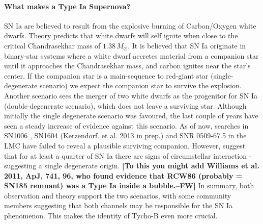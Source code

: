 \documentclass[12pt]{article}
\begin{document}
\vspace{-5mm}
\paragraph{What makes a Type Ia Supernova?}
SN Ia are believed to result from the explosive burning of Carbon/Oxygen white dwarfs. Theory predicts that white dwarfs will self ignite when close to the critical Chandrasekhar mass of  $1.38\,M_\odot$. 
It is believed that SN Ia originate in binary-star systems where a white dwarf accretes material from a companion star until it approaches the Chandrasekhar mass, and carbon ignites near the star's center. If the companion star is a main-sequence to red-giant star (single-degenerate scenario) we expect the companion star to survive the explosion. Another scenario sees the merger of two white dwarfs as the progenitor for SN Ia (double-degenerate scenario), which does not leave a surviving star. 
Although initially the single degenerate scenario was favoured, the last couple of years have seen a steady increase of evidence against this scenario. As of now, searches in SN1006 \citep{2012Natur.489..533G,2012ApJ...759....7K}, SN1604 (Kerzendorf. et al. 2013 in prep.) and SNR 0509-67.5 in the LMC \citep{2012Natur.481..164S} have failed to reveal a plausible surviving companion. However, \citet{2011Sci...333..856S, 2007Sci...317..924P, 2012arXiv1203.2916F} suggest that for at least a quarter of SN Ia there are signs of circumstellar interaction - suggesting a single degenerate origin. {\bf[To this  you might add Williams et al. 2011, ApJ, 741, 96, who found evidence that  RCW86 (probably = SN185 remnant) was a Type Ia inside a bubble.--FW]} In summary, both observation and theory support the two scenarios, with some community members suggesting that both channels may be responsible for the SN Ia phenomenon. This makes the identity of Tycho-B even more crucial.


\vspace{-5mm}
\end{document}
